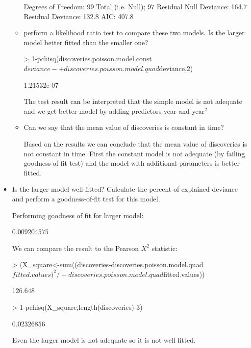\documentclass[a4paper]{article}
\begin{document}
\begin{itemize}
\begin{itemize}
\begin{Schunk}
\begin{Soutput}
Degrees of Freedom: 99 Total (i.e. Null);  97 Residual
Null Deviance:	    164.7 
Residual Deviance: 132.8 	AIC: 407.8
\end{Soutput}
\end{Schunk}
\item perform a likelihood ratio test to compare these two models. Is the larger
model better fitted than the smaller one?
\begin{Schunk}
\begin{Sinput}
> 	1-pchisq(discoveries.poisson.model.const$deviance-
+ 					discoveries.poisson.model.quad$deviance,2)
\end{Sinput}
\begin{Soutput}
[1] 1.21532e-07
\end{Soutput}
\end{Schunk}
The test result can be interpreted that the simple model is not adequate and we
get better model by adding predictors year and year$^2$
\item Can we say that the mean value of discoveries is constant in time?

Based on the results we can conclude that the mean value of discoveries is not
constant in time. First the constant model is not adequate (by failing goodness
of fit test) and the model with additional parameters is better fitted.
\end{itemize}
\item Is the larger model well-fitted? Calculate the percent of explained
deviance and perform a goodness-of-fit test for this model.

Performing goodness of fit for larger model:
\begin{Schunk}
\begin{Soutput}
[1] 0.009204575
\end{Soutput}
\end{Schunk}
We can compare the result to the Pearson $X^2$ statistic:
\begin{Schunk}
\begin{Sinput}
> (X_square<-sum((discoveries-discoveries.poisson.model.quad$fitted.values)^2/
+ 							discoveries.poisson.model.quad$fitted.values))
\end{Sinput}
\begin{Soutput}
[1] 126.648
\end{Soutput}
\begin{Sinput}
> 1-pchisq(X_square,length(discoveries)-3)	
\end{Sinput}
\begin{Soutput}
[1] 0.02326856
\end{Soutput}
\end{Schunk}
Even the larger model is not adequate so it is not well fitted.


\end{itemize}
\end{document}
